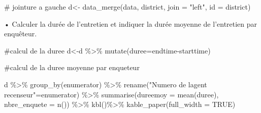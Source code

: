 \documentclass[
  letterpaper,
  DIV=11,
  numbers=noendperiod]{scrartcl}
\newenvironment{Shaded}{\begin{snugshade}}{\end{snugshade}}
\newcommand{\AttributeTok}[1]{\textcolor[rgb]{0.40,0.45,0.13}{#1}}
\newcommand{\CommentTok}[1]{\textcolor[rgb]{0.37,0.37,0.37}{#1}}
\newcommand{\ConstantTok}[1]{\textcolor[rgb]{0.56,0.35,0.01}{#1}}
\newcommand{\FunctionTok}[1]{\textcolor[rgb]{0.28,0.35,0.67}{#1}}
\newcommand{\NormalTok}[1]{\textcolor[rgb]{0.00,0.23,0.31}{#1}}
\newcommand{\OtherTok}[1]{\textcolor[rgb]{0.00,0.23,0.31}{#1}}
\newcommand{\SpecialCharTok}[1]{\textcolor[rgb]{0.37,0.37,0.37}{#1}}
\newcommand{\StringTok}[1]{\textcolor[rgb]{0.13,0.47,0.30}{#1}}
\begin{document}
\begin{Shaded}
\begin{Highlighting}[]
\CommentTok{\# jointure a gauche}
\NormalTok{d}\OtherTok{\textless{}{-}} \FunctionTok{data\_merge}\NormalTok{(data, district, }\AttributeTok{join =} \StringTok{"left"}\NormalTok{, }\AttributeTok{id =}\NormalTok{ district)}
\end{Highlighting}
\end{Shaded}

• Calculer la durée de l'entretien et indiquer la durée moyenne de
l'entretien par enquêteur.

\begin{Shaded}
\begin{Highlighting}[]
\CommentTok{\#calcul de la duree}
\NormalTok{d}\OtherTok{\textless{}{-}}\NormalTok{d }\SpecialCharTok{\%\textgreater{}\%} 
     \FunctionTok{mutate}\NormalTok{(}\AttributeTok{duree=}\NormalTok{endtime}\SpecialCharTok{{-}}\NormalTok{starttime)}

\CommentTok{\#calcul de la duree moyenne par enqueteur}

\NormalTok{d }\SpecialCharTok{\%\textgreater{}\%}
  \FunctionTok{group\_by}\NormalTok{(enumerator) }\SpecialCharTok{\%\textgreater{}\%} 
     \FunctionTok{rename}\NormalTok{(}\StringTok{"Numero de l\textquotesingle{}agent recenseur"}\OtherTok{=}\NormalTok{enumerator) }\SpecialCharTok{\%\textgreater{}\%} 
        \FunctionTok{summarise}\NormalTok{(}\AttributeTok{dureemoy =} \FunctionTok{mean}\NormalTok{(duree), }\AttributeTok{nbre\_enquete =} \FunctionTok{n}\NormalTok{()) }\SpecialCharTok{\%\textgreater{}\%} 
            \FunctionTok{kbl}\NormalTok{()}\SpecialCharTok{\%\textgreater{}\%} 
              \FunctionTok{kable\_paper}\NormalTok{(}\AttributeTok{full\_width =} \ConstantTok{TRUE}\NormalTok{)}
\end{Highlighting}
\end{Shaded}
\end{document}
